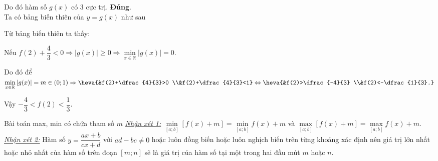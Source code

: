 \begin{ex}
{\begin{itemchoice}
Do đó hàm số $g(x)$ có $3$ cực trị.
\itemch \textbf{Đúng}.\\
Ta có bảng biến thiên của $y=g(x)$ như sau
\begin{center}
\end{center}
Từ bảng biến thiên ta thấy:

Nếu $f(2)+\dfrac{4}{3}<0 \Rightarrow |g(x)| \geq 0 \Rightarrow \min\limits_{x\in\mathbb{R}} |g(x)|=0$.

Do đó để $\min\limits_{x\in\mathbb{R}} |g(x)|=m \in (0;1) \Rightarrow \heva{&f(2)+\dfrac{4}{3}>0 \\&f(2)+\dfrac{4}{3}<1}\Leftrightarrow \heva{&f(2)>\dfrac{-4}{3} \\&f(2)<-\dfrac{1}{3}.}$

Vậy $-\dfrac{4}{3}<f(2)<\dfrac{1}{3}$.
\end{itemchoice}
}
\end{ex}
\begin{dang}{Bài toán max, min có chứa tham số $m$}
	\iconMT \underline{\textit{Nhận xét 1:}} $\min \limits_{[a;b]} [f(x)+m]=\min \limits_{[a;b]} f(x)+m$ và $\max \limits_{[a;b]} [f(x)+m]=\max \limits_{[a;b]} f(x)+m$.\\
	\iconMT \underline{\textit{Nhận xét 2:}} Hàm số $y=\dfrac{ax+b}{cx+d}$ với $ad-bc\ne 0$ hoặc luôn đồng biến hoặc luôn nghịch biến trên từng khoảng xác định nên giá trị lớn nhất hoặc nhỏ nhất của hàm số trên đoạn $[m;n]$ sẽ là giá trị của hàm số tại một trong hai đầu mút $m$ hoặc $n$.
\end{dang}
\viduminhhoa

